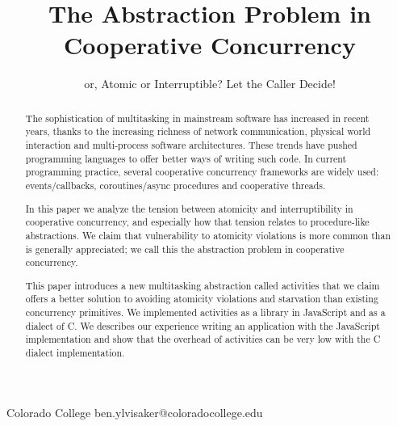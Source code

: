 \documentclass[preprint, 10pt, numbers]{sigplanconf}
\begin{document}
\newcommand{\charcoal}{DblBlind}
\newcommand{\atomic}{\texttt{atomic}}

\setlength{\pdfpageheight}{\paperheight}
\setlength{\pdfpagewidth}{\paperwidth}



\title{The Abstraction Problem in Cooperative Concurrency}
\subtitle{or, Atomic or Interruptible?
Let the Caller Decide!}

           {Colorado College}
           {ben.ylvisaker@coloradocollege.edu}

\maketitle

\begin{abstract}

The sophistication of multitasking in mainstream software has increased in recent years, thanks to the increasing richness of network communication, physical world interaction and multi-process software architectures.
These trends have pushed programming languages to offer better ways of writing such code.
In current programming practice, several cooperative concurrency frameworks are widely used:
events/callbacks, coroutines/async procedures and cooperative threads.

In this paper we analyze the tension between atomicity and interruptibility in cooperative concurrency, and especially how that tension relates to procedure-like abstractions.
We claim that vulnerability to atomicity violations is more common than is generally appreciated; we call this the abstraction problem in cooperative concurrency.

This paper introduces a new multitasking abstraction called activities that we claim offers a better solution to avoiding atomicity violations and starvation than existing concurrency primitives.
We implemented activities as a library in JavaScript and as a dialect of C.
We describes our experience writing an application with the JavaScript implementation and show that the overhead of activities can be very low with the C dialect implementation.

\end{abstract}
\end{document}
